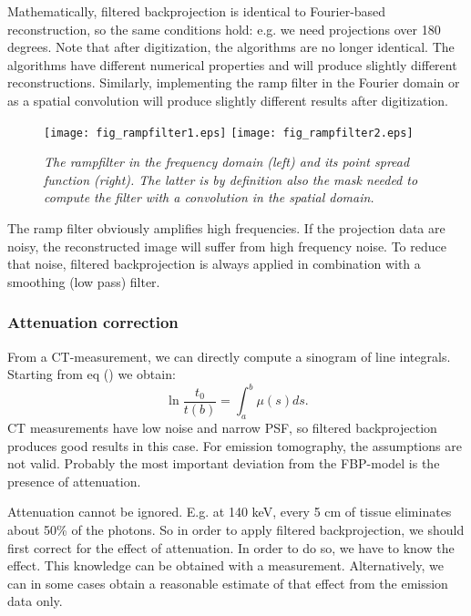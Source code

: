 Mathematically, filtered backprojection is identical to Fourier-based
reconstruction, so the same conditions hold: e.g. we need projections over 180
degrees. Note that after digitization, the algorithms are no longer identical.
The algorithms have different numerical properties and will produce slightly
different reconstructions. Similarly, implementing the ramp filter in the
Fourier domain or as a spatial convolution will produce slightly different
results after digitization. 
%
\begin{figure}[tb]
  \texttt{[image: fig\_rampfilter1.eps]}
  \texttt{[image: fig\_rampfilter2.eps]}
\caption{\label{fig:rampfilter} \emph{The rampfilter in the frequency
    domain (left) and its point spread function (right). The latter is
    by definition also the mask needed to compute the filter with a
    convolution in the spatial domain.}}
\end{figure}

The ramp filter obviously amplifies high frequencies. If the
projection data are noisy, the reconstructed image will suffer from
high frequency noise. To reduce that noise, filtered backprojection is
always applied in combination with a smoothing (low pass) filter.

\subsubsection{Attenuation correction \label{sec:attencor}}
From a CT-measurement, we can directly compute a sinogram of line integrals.
Starting from eq () we obtain:
\begin{equation}
  \ln \frac{t_0}{t(b)} = \int_a^b \mu(s) ds. \label{eq:attencor}
\end{equation}
CT measurements have low noise and narrow PSF, so filtered backprojection
produces good results in this case. For emission tomography, the assumptions
are not valid. Probably the most important deviation from the FBP-model is the
presence of attenuation.

Attenuation cannot be ignored. E.g. at 140 keV, every 5 cm of tissue eliminates
about 50\% of the photons. So in order to apply filtered backprojection, we
should first correct for the effect of attenuation. In order to do so, we have
to know the effect. This knowledge can be obtained with a measurement.
Alternatively, we can in some cases obtain a reasonable estimate of that effect
from the emission data only.

